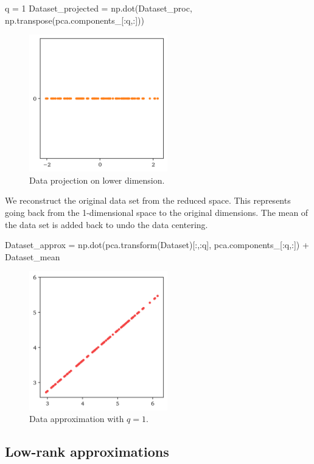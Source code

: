 \documentclass[10pt,twocolumn]{article}
\begin{document}
\begin{python}
q = 1
Dataset_projected = np.dot(Dataset_proc,
np.transpose(pca.components_[:q,:]))
\end{python}

\begin{figure}[H]
\centering\includegraphics[width=6cm]{python-data-projection.png}
\caption{Data projection on lower dimension.}
\label{fig:python-data-projection}
\end{figure}

We reconstruct the original data set from the reduced space. This represents going back from the 1-dimensional space to the original dimensions. The mean of the data set is added back to undo the data centering.

\begin{python}
Dataset_approx = 
np.dot(pca.transform(Dataset)[:,:q], 
pca.components_[:q,:]) + Dataset_mean
\end{python}

\begin{figure}[H]
\centering\includegraphics[width=6cm]{python-data-approximation.png}
\caption{Data approximation with $q = 1$.}
\label{fig:python-data-approximation}
\end{figure}

\subsection{Low-rank approximations}
\end{document}
